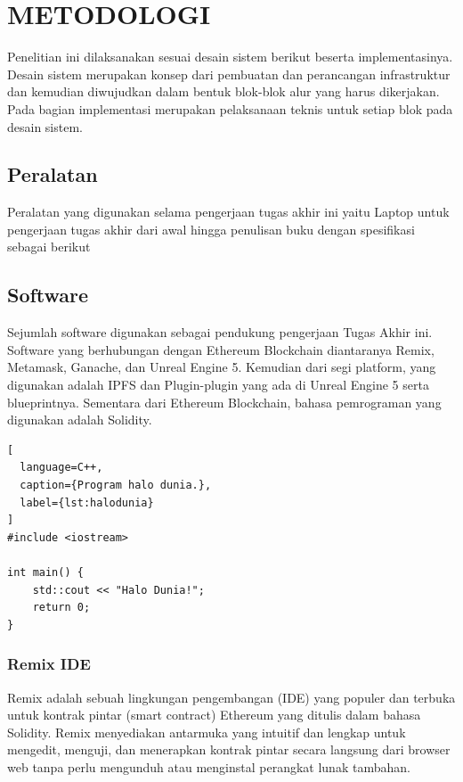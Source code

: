 \chapter{METODOLOGI}
\label{chap:desainimplementasi}


Penelitian ini dilaksanakan sesuai desain sistem berikut beserta implementasinya.
Desain sistem merupakan konsep dari pembuatan dan perancangan infrastruktur dan kemudian
diwujudkan dalam bentuk blok-blok alur yang harus dikerjakan. Pada bagian implementasi merupakan
pelaksanaan teknis untuk setiap blok pada desain sistem.

\section{Peralatan}
\label{sec:peralatan}

Peralatan yang digunakan selama pengerjaan tugas akhir ini yaitu Laptop untuk pengerjaan tugas akhir dari awal hingga penulisan buku dengan spesifikasi sebagai berikut

\section{Software}
\label{sec:software}

Sejumlah software digunakan sebagai pendukung pengerjaan Tugas Akhir ini.
Software yang berhubungan dengan Ethereum Blockchain diantaranya Remix,
Metamask, Ganache, dan Unreal Engine 5. Kemudian dari segi platform, yang digunakan adalah IPFS
dan Plugin-plugin yang ada di Unreal Engine 5 serta blueprintnya. Sementara dari Ethereum Blockchain,
bahasa pemrograman yang digunakan adalah Solidity.

\begin{lstlisting}[
  language=C++,
  caption={Program halo dunia.},
  label={lst:halodunia}
]
#include <iostream>

int main() {
    std::cout << "Halo Dunia!";
    return 0;
}
\end{lstlisting}

\subsection{Remix IDE}
Remix adalah sebuah lingkungan pengembangan (IDE) yang populer dan terbuka untuk kontrak pintar (smart contract) Ethereum yang ditulis dalam bahasa Solidity. Remix menyediakan antarmuka yang intuitif dan lengkap untuk mengedit, menguji, dan menerapkan kontrak pintar secara langsung dari browser web tanpa perlu mengunduh atau menginstal perangkat lunak tambahan.

